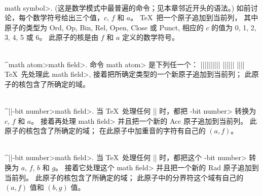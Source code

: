 \\\<math symbol>.\enskip
(这是数学模式中最普遍的命令；见本章邻近开头的语法。)
如前讨论，每个数学符号给出三个值，$c$, $f$ 和 $a$。%
 \TeX\ 把一个原子追加到当前列，
其中原子的类型为 Ord, Op, Bin, Rel, Open, Close 或 Punct,
相应的 $c$ 的值为 0, 1, 2, 3, 4, 5 或 6。%
此原子的核是由 $f$ 和 $a$ 定义的数学符号。

\\^\<math atom>\<math field>.\enskip
命令 \<math atom> 是下列任一个：
\begindisplay
|\mathord|\alt|\mathop|\alt|\mathbin|\alt|\mathrel|\alt|\mathopen|\cr
\qquad\alt|\mathclose|\alt|\mathpunct|\alt|\mathinner|
  \alt|\underline|\alt|\overline|\cr
\enddisplay
 \TeX\ 先处理此 \<math field>, 接着把所确定类型的一个新原子追加到当前列；
此原子的核包含了所确定的域。

\\^|\mathaccent|-bit number>\<math field>.\enskip
当 \TeX\ 处理任何 |\mathchar| 时，都把 -bit number> 转换为 $c$, $f$ 和 $a$。%
接着再处理 \<math field> 并且把一个新的 Acc 原子追加到当前列。%
此原子的核包含了所确定的域；
在此原子中加重音的字符有自己的 $(a,f)$。

\\^|\radical|-bit number>\<math field>.\enskip
当 \TeX\ 处理任何 |\delimiter| 时，都把这个 -bit number> 转换为 $a$, $f$,
$b$ 和 $g$。%
接着它处理这个 \<math field> 并且把一个新的 Rad 原子追加到当前列。%
此原子的核包含了所确定的域；
此原子中的分界符这个域有自己的 $(a, f)$ 值和 $(b, g)$ 值。


